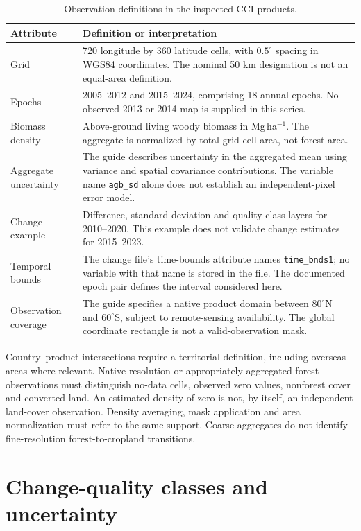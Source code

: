 \documentclass[11pt,a4paper]{article}
\begin{document}
\begin{table}[htbp]
\centering\small
\caption{Observation definitions in the inspected CCI products.}\label{tab:products}
\begin{tabularx}{\textwidth}{p{}X}
\toprule
Attribute & Definition or interpretation\\\midrule
Grid & 720 longitude by 360 latitude cells, with $0.5^\circ$ spacing in WGS84 coordinates. The nominal 50 km designation is not an equal-area definition.\\
Epochs & 2005--2012 and 2015--2024, comprising 18 annual epochs. No observed 2013 or 2014 map is supplied in this series.\\
Biomass density & Above-ground living woody biomass in Mg\,ha$^{-1}$. The aggregate is normalized by total grid-cell area, not forest area.\\
Aggregate uncertainty & The guide describes uncertainty in the aggregated mean using variance and spatial covariance contributions. The variable name \texttt{agb\_sd} alone does not establish an independent-pixel error model.\\
Change example & Difference, standard deviation and quality-class layers for 2010--2020. This example does not validate change estimates for 2015--2023.\\
Temporal bounds & The change file's time-bounds attribute names \texttt{time\_bnds1}; no variable with that name is stored in the file. The documented epoch pair defines the interval considered here.\\
Observation coverage & The guide specifies a native product domain between $80^\circ$N and $60^\circ$S, subject to remote-sensing availability. The global coordinate rectangle is not a valid-observation mask.\\\bottomrule
\end{tabularx}
\end{table}

Country--product intersections require a territorial definition, including overseas areas where relevant. Native-resolution or appropriately aggregated forest observations must distinguish no-data cells, observed zero values, nonforest cover and converted land. An estimated density of zero is not, by itself, an independent land-cover observation. Density averaging, mask application and area normalization must refer to the same support. Coarse aggregates do not identify fine-resolution forest-to-cropland transitions.

\section{Change-quality classes and uncertainty}
\end{document}

